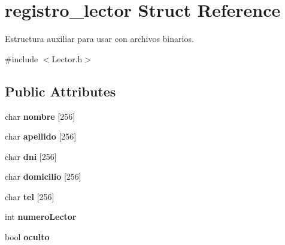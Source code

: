 \hypertarget{structregistro__lector}{}\section{registro\+\_\+lector Struct Reference}
\label{structregistro__lector}


Estructura auxiliar para usar con archivos binarios.  




{\ttfamily \#include $<$Lector.\+h$>$}

\subsection*{Public Attributes}
\begin{DoxyCompactItemize}
\item 
char {\bfseries nombre} \mbox{[}256\mbox{]}\hypertarget{structregistro__lector_a76dbf5af6bfe9a42e8f87d4d624a5a57}{}\label{structregistro__lector_a76dbf5af6bfe9a42e8f87d4d624a5a57}

\item 
char {\bfseries apellido} \mbox{[}256\mbox{]}\hypertarget{structregistro__lector_a12f214e775bed9eebbd30592f9f0e331}{}\label{structregistro__lector_a12f214e775bed9eebbd30592f9f0e331}

\item 
char {\bfseries dni} \mbox{[}256\mbox{]}\hypertarget{structregistro__lector_ace928ead5481bfbfe4b22cdd08cb644b}{}\label{structregistro__lector_ace928ead5481bfbfe4b22cdd08cb644b}

\item 
char {\bfseries domicilio} \mbox{[}256\mbox{]}\hypertarget{structregistro__lector_a302d8795ab5c40a80dfcf025012ef4f5}{}\label{structregistro__lector_a302d8795ab5c40a80dfcf025012ef4f5}

\item 
char {\bfseries tel} \mbox{[}256\mbox{]}\hypertarget{structregistro__lector_adec4e1183f67c388ca79575b6fad7bda}{}\label{structregistro__lector_adec4e1183f67c388ca79575b6fad7bda}

\item 
int {\bfseries numero\+Lector}\hypertarget{structregistro__lector_a44bc703bc8b0910fe5ad579f08b810fa}{}\label{structregistro__lector_a44bc703bc8b0910fe5ad579f08b810fa}

\item 
bool {\bfseries oculto}\hypertarget{structregistro__lector_ab079adb75612f8389b61e0ea2fabbd53}{}\label{structregistro__lector_ab079adb75612f8389b61e0ea2fabbd53}

\end{DoxyCompactItemize}


